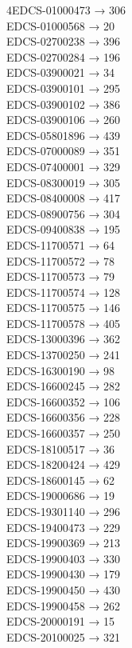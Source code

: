 \begin{multicols}{4}\footnotesize\noindent EDCS-01000473 → 306\\
EDCS-01000568 → 20\\
EDCS-02700238 → 396\\
EDCS-02700284 → 196\\
EDCS-03900021 → 34\\
EDCS-03900101 → 295\\
EDCS-03900102 → 386\\
EDCS-03900106 → 260\\
EDCS-05801896 → 439\\
EDCS-07000089 → 351\\
EDCS-07400001 → 329\\
EDCS-08300019 → 305\\
EDCS-08400008 → 417\\
EDCS-08900756 → 304\\
EDCS-09400838 → 195\\
EDCS-11700571 → 64\\
EDCS-11700572 → 78\\
EDCS-11700573 → 79\\
EDCS-11700574 → 128\\
EDCS-11700575 → 146\\
EDCS-11700578 → 405\\
EDCS-13000396 → 362\\
EDCS-13700250 → 241\\
EDCS-16300190 → 98\\
EDCS-16600245 → 282\\
EDCS-16600352 → 106\\
EDCS-16600356 → 228\\
EDCS-16600357 → 250\\
EDCS-18100517 → 36\\
EDCS-18200424 → 429\\
EDCS-18600145 → 62\\
EDCS-19000686 → 19\\
EDCS-19301140 → 296\\
EDCS-19400473 → 229\\
EDCS-19900369 → 213\\
EDCS-19900403 → 330\\
EDCS-19900430 → 179\\
EDCS-19900450 → 430\\
EDCS-19900458 → 262\\
EDCS-20000191 → 15\\
EDCS-20100025 → 321\\

\end{multicols}
